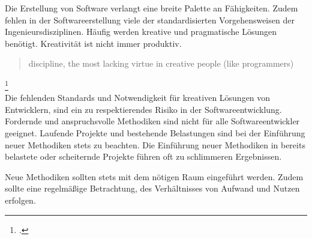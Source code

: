 Die Erstellung von Software verlangt eine breite Palette an Fähigkeiten. Zudem fehlen in der Softwareerstellung viele der standardisierten Vorgehensweisen der Ingenieursdisziplinen. Häufig werden kreative und pragmatische Lösungen benötigt. Kreativität ist nicht immer produktiv.
\vspace{1em}\\
\blockquote {discipline, the most lacking virtue in creative people (like programmers)}\footcite[][S.167]{git-essentials-2017}
\vspace{1em}\\
Die fehlenden Standards und Notwendigkeit für kreativen Lösungen von Entwicklern, sind ein zu respektierendes Risiko in der Softwareentwicklung. Fordernde und anspruchsvolle Methodiken sind nicht für alle Softwareentwickler geeignet. Laufende Projekte und bestehende Belastungen sind bei der Einführung neuer Methodiken stets zu beachten. Die Einführung neuer Methodiken in bereits belastete oder scheiternde Projekte führen oft zu schlimmeren Ergebnissen.

Neue Methodiken sollten stets mit dem nötigen Raum eingeführt werden. Zudem sollte eine regelmäßige Betrachtung, des Verhältnisses von Aufwand und Nutzen erfolgen.
